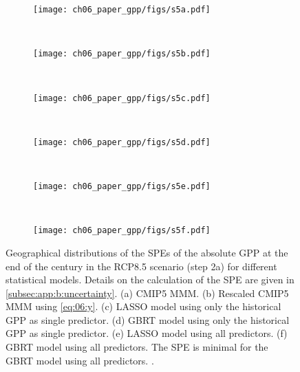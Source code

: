 \begin{figure}[p]
  \centering
  \begin{subfigure}[b]{\SubfigureWidth{}}
    \texttt{[image: ch06\_paper\_gpp/figs/s5a.pdf]}
    \caption{}
    \label{fig:app:b:step2a_results_errors:a}
  \end{subfigure}
  ~
  \begin{subfigure}[b]{\SubfigureWidth{}}
    \texttt{[image: ch06\_paper\_gpp/figs/s5b.pdf]}
    \caption{}
    \label{fig:app:b:step2a_results_errors:b}
  \end{subfigure}
  \\
  \begin{subfigure}[b]{\SubfigureWidth{}}
    \texttt{[image: ch06\_paper\_gpp/figs/s5c.pdf]}
    \caption{}
    \label{fig:app:b:step2a_results_errors:c}
  \end{subfigure}
  ~
  \begin{subfigure}[b]{\SubfigureWidth{}}
    \texttt{[image: ch06\_paper\_gpp/figs/s5d.pdf]}
    \caption{}
    \label{fig:app:b:step2a_results_errors:d}
  \end{subfigure}
  \\
  \begin{subfigure}[b]{\SubfigureWidth{}}
    \texttt{[image: ch06\_paper\_gpp/figs/s5e.pdf]}
    \caption{}
    \label{fig:app:b:step2a_results_errors:e}
  \end{subfigure}
  ~
  \begin{subfigure}[b]{\SubfigureWidth{}}
    \texttt{[image: ch06\_paper\_gpp/figs/s5f.pdf]}
    \caption{}
    \label{fig:app:b:step2a_results_errors:f}
  \end{subfigure}
  \caption{Geographical distributions of the \acfp{SPE} of the absolute
    \acf{GPP} at the end of the  century in the \acs{RCP}8.5 scenario
    (step 2a) for different statistical models. Details on the calculation of
    the \acs{SPE} are given in \cref{subsec:app:b:uncertainty}. (a) \acs{CMIP}5
    \acf{MMM}. (b) Rescaled \acs{CMIP}5 \acs{MMM} using \cref{eq:06:y}. (c)
    \Acf{LASSO} model using only the historical \acs{GPP} as single predictor.
    (d) \Acf{GBRT} model using only the historical \acs{GPP} as single
    predictor. (e) \acs{LASSO} model using all predictors. (f) \acs{GBRT}
    model using all predictors. The \acs{SPE} is minimal for the \acs{GBRT}
    model using all predictors. .}
  \label{fig:app:b:step2a_results_errors}
\end{figure}

